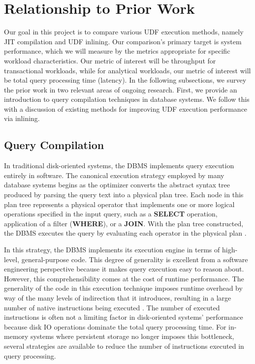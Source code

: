 \documentclass{vldb}
\newcommand{\dbCode}[1]{{\sffamily\small \textbf{#1}}\xspace}
\begin{document}

\section{Relationship to Prior Work}

Our goal in this project is to compare various UDF execution methods, namely JIT compilation and UDF inlining. Our comparison's primary target is system performance, which we will measure by the metrics appropriate for specific workload characteristics. Our metric of interest will be throughput for transactional workloads, while for analytical workloads, our metric of interest will be total query processing time (latency). In the following subsections, we survey the prior work in two relevant areas of ongoing research. First, we provide an introduction to query compilation techniques in database systems. We follow this with a discussion of existing methods for improving UDF execution performance via inlining.

\subsection{Query Compilation}

In traditional disk-oriented systems, the DBMS implements query execution entirely in software. The canonical execution strategy employed by many database systems begins as the optimizer converts the abstract syntax tree produced by parsing the query text into a physical plan tree. Each node in this plan tree represents a physical operator that implements one or more logical operations specified in the input query, such as a \dbCode{SELECT} operation, application of a filter (\dbCode{WHERE}), or a \dbCode{JOIN}. With the plan tree constructed, the DBMS executes the query by evaluating each operator in the physical plan \cite{graefe93, graefe94, dbconcepts}. 

In this strategy, the DBMS implements its execution engine in terms of high-level, general-purpose code. This degree of generality is excellent from a software engineering perspective because it makes query execution easy to reason about. However, this comprehensibility comes at the cost of runtime performance. The generality of the code in this execution technique imposes runtime overhead by way of the many levels of indirection that it introduces, resulting in a large number of native instructions being executed \cite{freedman14}. The number of executed instructions is often not a limiting factor in disk-oriented systems' performance because disk IO operations dominate the total query processing time. For in-memory systems where persistent storage no longer imposes this bottleneck, several strategies are available to reduce the number of instructions executed in query processing.
\end{document}
